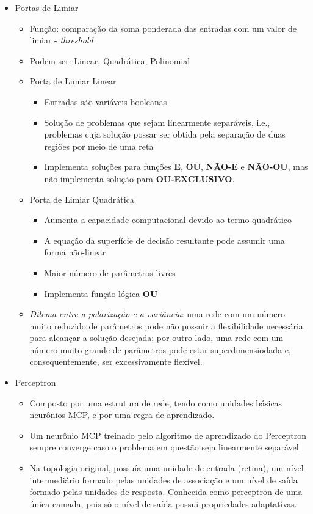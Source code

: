\documentclass{article}
\begin{document}
\begin{itemize}
	\item Portas de Limiar
	\begin{itemize}
		\item Função: comparação da soma ponderada das entradas com um valor de limiar - \textit{threshold}
		\item Podem ser: Linear, Quadrática, Polinomial
		\item Porta de Limiar Linear
		\begin{itemize}
			\item Entradas são variáveis booleanas
			\item Solução de problemas que sejam linearmente separáveis, i.e., problemas cuja solução possar ser obtida pela separação de duas regiões por meio de uma reta
			\item Implementa soluções para funções \textbf{E}, \textbf{OU}, \textbf{NÃO-E} e \textbf{NÃO-OU}, mas não implementa solução para \textbf{OU-EXCLUSIVO}.
		\end{itemize}
		\item Porta de Limiar Quadrática
		\begin{itemize}
			\item Aumenta a capacidade computacional devido ao termo quadrático
			\item A equação da superfície de decisão resultante pode assumir uma forma não-linear
			\item Maior número de parâmetros livres
			\item Implementa função lógica \textbf{OU}
		\end{itemize}		
		\item \emph{Dilema entre a polarização e a variância}: uma rede com um número muito reduzido de parâmetros pode não possuir a flexibilidade necessária para alcançar a solução desejada; por outro lado, uma rede com um número muito grande de parâmetros pode estar superdimensiodada e, consequentemente, ser excessivamente flexível.
	\end{itemize}
	\item Perceptron
	\begin{itemize}
		\item Composto por uma estrutura de rede, tendo como unidades básicas neurônios MCP, e por uma regra de aprendizado.
		\item Um neurônio MCP treinado pelo algoritmo de aprendizado do Perceptron sempre converge caso o problema em questão seja linearmente separável
		\item Na topologia original, possuía uma unidade de entrada (retina), um nível intermediário formado pelas unidades de associação e um nível de saída formado pelas unidades de resposta. Conhecida como perceptron de uma única camada, pois só o nível de saída possui propriedades adaptativas.

\end{itemize}
\end{itemize}
\end{document}
